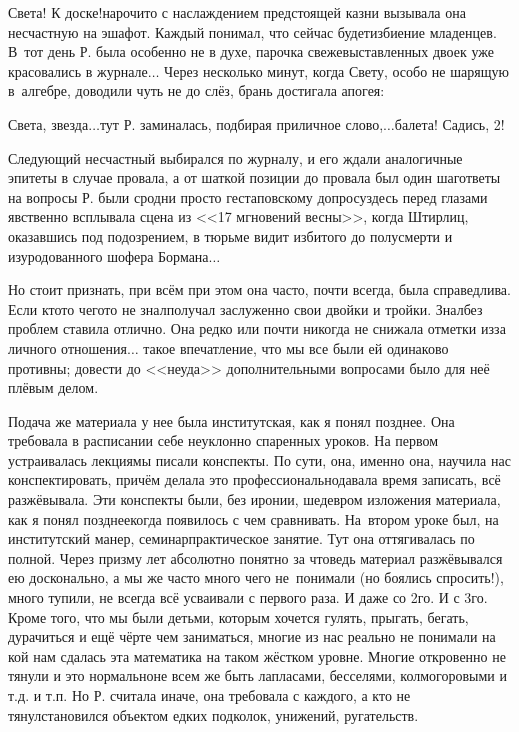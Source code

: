 \diagdash Света! К доске!\mdash нарочито с наслаждением предстоящей казни вызывала она несчастную на эшафот. Каждый понимал, что сейчас будет\mdash избиение младенцев. В~тот день Р. была особенно не в духе, парочка свежевыставленных двоек уже красовались в журнале$\ldots$ Через несколько минут, когда Свету, особо не шарящую в~алгебре, доводили чуть не до слёз, брань достигала апогея:

\diagdash Света, звезда$\ldots$\mdash тут Р. заминалась, подбирая приличное слово,\mdash $\ldots$балета! Садись, 2!

Следующий несчастный выбирался по журналу, и его ждали аналогичные эпитеты в случае провала, а от шаткой позиции до провала был один шаг\mdash ответы на вопросы Р. были сродни просто гестаповскому допросу\mdash здесь перед глазами явственно всплывала сцена из <<17 мгновений весны>>, когда Штирлиц, оказавшись под подозрением, в тюрьме видит избитого до полусмерти и изуродованного шофера Бормана$\ldots$

Но стоит признать, при всём при этом она часто, почти всегда, была справедлива. Если кто\sdash то чего\sdash то не знал\mdash получал заслуженно свои двойки и тройки. Знал\mdash без проблем ставила отлично. Она редко или почти никогда не снижала отметки из\sdash за личного отношения$\ldots$ такое впечатление, что мы все были ей одинаково противны; довести до <<неуда>> дополнительными вопросами было для неё плёвым делом. 

Подача же материала у нее была институтская, как я понял позднее. Она требовала в расписании себе неуклонно спаренных уроков. На первом устраивалась лекция\mdash мы писали конспекты. По сути, она, именно она, научила нас конспектировать, причём делала это профессионально\mdash давала время записать, всё разжёвывала. Эти конспекты были, без иронии, шедевром изложения материала, как я понял позднее\mdash когда появилось с чем сравнивать. На~втором уроке был, на институтский манер, семинар\mdash практическое занятие. Тут она оттягивалась по полной. Через призму лет абсолютно понятно за что\mdash ведь материал разжёвывался ею досконально, а мы же часто много чего не~понимали (но боялись спросить!), много тупили, не всегда всё усваивали с  первого раза. И даже со 2\sdash го. И с 3\sdash го. Кроме того, что мы были детьми, которым хочется гулять, прыгать, бегать, дурачиться и ещё чёрте чем заниматься, многие из нас реально не понимали на кой нам сдалась эта математика на таком жёстком уровне. Многие откровенно не тянули и это нормально\mdash не всем же быть лапласами, бесселями, колмогоровыми и т.д. и т.п. Но Р. считала иначе, она требовала с каждого, а кто не тянул\mdash становился объектом едких подколок, унижений, ругательств.


